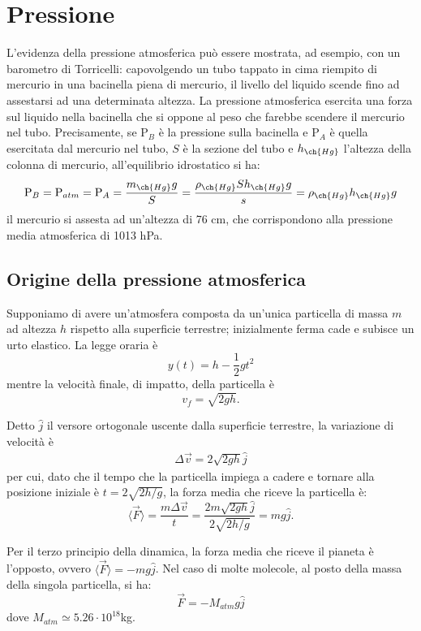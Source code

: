 \chapter{Pressione}
L'evidenza della pressione atmosferica può essere mostrata, ad esempio, con un barometro di Torricelli: capovolgendo un tubo tappato in cima riempito di mercurio in una bacinella piena di mercurio, il livello del liquido scende fino ad assestarsi ad una determinata altezza. La pressione atmosferica esercita una forza sul liquido nella bacinella che si oppone al peso che farebbe scendere il mercurio nel tubo. Precisamente, se P$_{B}$ è la pressione sulla bacinella e P$_{A}$ è quella esercitata dal mercurio nel tubo, $S$ è la sezione del tubo e $h_{\ch{Hg}}$ l'altezza della colonna di mercurio, all'equilibrio idrostatico si ha:
\begin{equation}
	\text{P}_{B}=\text{P}_{atm}=\text{P}_{A}=\frac{m_{\ch{Hg}}g}{S}=\frac{\rho_{\ch{Hg}} S h_{\ch{Hg}} g}{s}=\rho_{\ch{Hg}} h_{\ch{Hg}} g 
\end{equation}
il mercurio si assesta ad un'altezza di 76 cm, che corrispondono alla pressione media atmosferica di 1013 hPa.
\section{Origine della pressione atmosferica}
Supponiamo di avere un'atmosfera composta da un'unica particella di massa $m$ ad altezza $h$ rispetto alla superficie terrestre; inizialmente ferma cade e subisce un urto elastico. La legge oraria è
\begin{equation}
	y(t)=h-\frac{1}{2}gt^2
\end{equation}
mentre la velocità finale, di impatto, della particella è
\begin{equation}
	v_f=\sqrt{2gh}.
\end{equation} 

Detto $\hat{j}$ il versore ortogonale uscente dalla superficie terrestre, la variazione di velocità è
\begin{align}
	\Delta \vec{v}=2\sqrt{2gh}\hat{j}
\end{align}
per cui, dato che il tempo che la particella impiega a cadere e tornare alla posizione iniziale è $t=2\sqrt{2h/g}$, la forza media che riceve la particella è:
\begin{equation}
	\langle\vec{F}\rangle=\frac{m\Delta\vec{v}}{t}=\frac{2m\sqrt{2gh}\hat{j}}{2\sqrt{2h/g}}=mg\hat{j}.
\end{equation}

Per il terzo principio della dinamica, la forza media che riceve il pianeta è l'opposto, ovvero $\langle\vec{F}\rangle=-mg\hat{j}$. Nel caso di molte molecole, al posto della massa della singola particella, si ha:
\begin{equation}
	\vec{F}=-M_{atm}g\hat{j}
\end{equation}
dove $M_{atm}\simeq 5.26 \cdot 10^{18}$kg.


